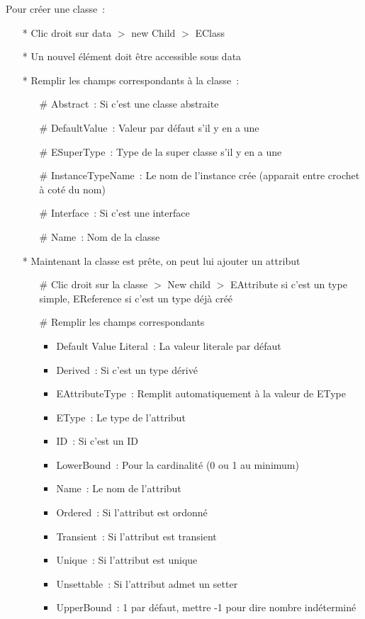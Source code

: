 \documentclass{article}
\begin{document}
Pour cr\'eer une classe~:
\begin{itemize}
\item[*] Clic droit sur data $>$ new Child $>$ EClass
\item[*] Un nouvel \'el\'ement doit \^etre accessible sous data
\item[*] Remplir les champs correspondants \`a la classe~:
  \begin{itemize}
  \item[\#] Abstract~: Si c'est une classe abstraite
  \item[\#] DefaultValue~: Valeur par d\'efaut s'il y en a une
  \item[\#] ESuperType~: Type de la super classe s'il y en a une
  \item[\#] InstanceTypeName~: Le nom de l'instance cr\'ee (apparait entre crochet \`a cot\'e du nom)
  \item[\#] Interface~: Si c'est une interface
  \item[\#] Name~: Nom de la classe
  \end{itemize}
\item[*] Maintenant la classe est pr\^ete, on peut lui ajouter un attribut
  \begin{itemize}
  \item[\#] Clic droit sur la classe $>$ New child $>$ EAttribute si c'est un type simple, EReference si c'est un type d\'ej\`a cr\'e\'e
  \item[\#] Remplir les champs correspondants
    \begin{itemize}
    \item Default Value Literal~: La valeur literale par d\'efaut
    \item Derived~: Si c'est un type d\'eriv\'e
    \item EAttributeType~: Remplit automatiquement \`a la valeur de EType
    \item EType~: Le type de l'attribut
    \item ID~: Si c'est un ID
    \item LowerBound~: Pour la cardinalit\'e (0 ou 1 au minimum)
    \item Name~: Le nom de l'attribut
    \item Ordered~: Si l'attribut est ordonn\'e
    \item Transient~: Si l'attribut est transient
    \item Unique~: Si l'attribut est unique
    \item Unsettable~: Si l'attribut admet un setter
    \item UpperBound~: 1 par d\'efaut, mettre -1 pour dire nombre ind\'etermin\'e

\end{itemize}
\end{itemize}
\end{itemize}
\end{document}

